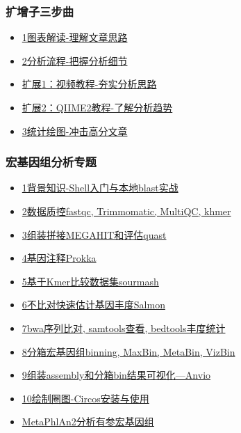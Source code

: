 \documentclass[]{article}
\providecommand{\tightlist}{%
  \setlength{\itemsep}{0pt}\setlength{\parskip}{0pt}}
\numberwithin{figure}{section}
\numberwithin{table}{section}
\begin{document}
\hypertarget{ux6269ux589eux5b50ux4e09ux6b65ux66f2}{%
\subsubsection{扩增子三步曲}\label{ux6269ux589eux5b50ux4e09ux6b65ux66f2}}

\begin{itemize}
\tightlist
\item
  \href{http://mp.weixin.qq.com/s/oiVHO2S1JgYrKXPDU6fH2g}{1图表解读-理解文章思路}\\
\item
  \href{http://mp.weixin.qq.com/s/KrYyy3jjzAL0rQzVfV6h4A}{2分析流程-把握分析细节}\\
\item
  \href{http://mp.weixin.qq.com/s/SxWl0qBJgg8ziZUFDmKvpQ}{扩展1：视频教程-夯实分析思路}\\
\item
  \href{http://mp.weixin.qq.com/s/wkn-91BVOSWZLRvlcaaEgg}{扩展2：QIIME2教程-了解分析趋势}\\
\item
  \href{http://mp.weixin.qq.com/s/6tNePiaDsPPzEBZjiCXIRg}{3统计绘图-冲击高分文章}
\end{itemize}

\hypertarget{ux5b8fux57faux56e0ux7ec4ux5206ux6790ux4e13ux9898}{%
\subsubsection{宏基因组分析专题}\label{ux5b8fux57faux56e0ux7ec4ux5206ux6790ux4e13ux9898}}

\begin{itemize}
\tightlist
\item
  \href{http://mp.weixin.qq.com/s/jASOBPzpwYCL-fWNUJJp8g}{1背景知识-Shell入门与本地blast实战}
\item
  \href{http://mp.weixin.qq.com/s/3O01eNMe79J_kUTaJjP6ag}{2数据质控fastqc, Trimmomatic, MultiQC, khmer}
\item
  \href{http://mp.weixin.qq.com/s/NMKX0iDuR_qOzmLXxC8MEQ}{3组装拼接MEGAHIT和评估quast}
\item
  \href{http://mp.weixin.qq.com/s/1TM61IrzrpVb5KhZ5A0kZQ}{4基因注释Prokka}
\item
  \href{https://mp.weixin.qq.com/s/Rmx-z1zxj7GF9ivJGWVvLg}{5基于Kmer比较数据集sourmash}
\item
  \href{http://mp.weixin.qq.com/s/2fwEtnEsBi5cJ65xyeoXxw}{6不比对快速估计基因丰度Salmon}
\item
  \href{http://mp.weixin.qq.com/s/rdTFTFg0rZOIa2_tuFEOUA}{7bwa序列比对, samtools查看, bedtools丰度统计}
\item
  \href{http://mp.weixin.qq.com/s/rZitcvykAlxnsNEzsW5JRg}{8分箱宏基因组binning, MaxBin, MetaBin, VizBin}
\item
  \href{http://mp.weixin.qq.com/s/FesH_mCunpZLpKC2pIg1UQ}{9组装assembly和分箱bin结果可视化---Anvio}
\item
  \href{http://mp.weixin.qq.com/s/FJlKY3kU5Fm6bYkjtwRkEw}{10绘制圈图-Circos安装与使用}
\item
  \href{http://mp.weixin.qq.com/s/xSjFGwcr1XIAZKdByJAWmQ}{MetaPhlAn2分析有参宏基因组}
\end{itemize}
\end{document}
